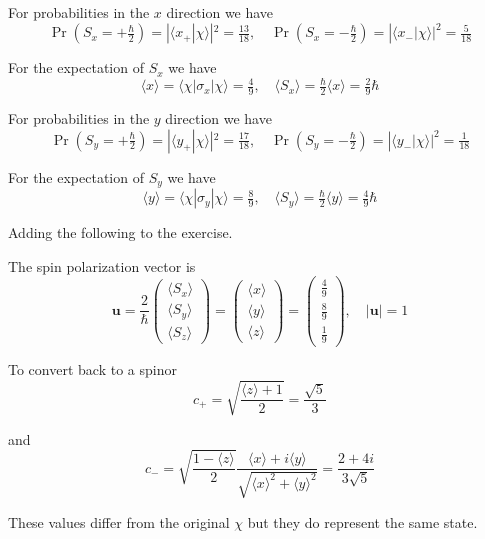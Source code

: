 For probabilities in the $x$ direction we have
\begin{equation*}
\Pr\left(S_x=+\tfrac{\hbar}{2}\right)=|\langle x_+|\chi\rangle|^2=\tfrac{13}{18},\quad
\Pr\left(S_x=-\tfrac{\hbar}{2}\right)=|\langle x_-|\chi\rangle|^2=\tfrac{5}{18}
\end{equation*}

For the expectation of $S_x$ we have
\begin{equation*}
\langle x\rangle=\langle\chi|\sigma_x|\chi\rangle=\tfrac{4}{9},\quad
\langle S_x\rangle=\tfrac{\hbar}{2}\langle x\rangle=\tfrac{2}{9}\hbar
\end{equation*}

For probabilities in the $y$ direction we have
\begin{equation*}
\Pr\left(S_y=+\tfrac{\hbar}{2}\right)=|\langle y_+|\chi\rangle|^2=\tfrac{17}{18},\quad
\Pr\left(S_y=-\tfrac{\hbar}{2}\right)=|\langle y_-|\chi\rangle|^2=\tfrac{1}{18}
\end{equation*}

For the expectation of $S_y$ we have
\begin{equation*}
\langle y\rangle=\langle\chi|\sigma_y|\chi\rangle=\tfrac{8}{9},\quad
\langle S_y\rangle=\tfrac{\hbar}{2}\langle y\rangle=\tfrac{4}{9}\hbar
\end{equation*}

Adding the following to the exercise.

\bigskip
The spin polarization vector is
\begin{equation*}
\mathbf u=\frac{2}{\hbar}
\begin{pmatrix}
\langle S_x\rangle
\\[1ex]
\langle S_y\rangle
\\[1ex]
\langle S_z\rangle
\end{pmatrix}
=
\begin{pmatrix}
\langle x\rangle
\\[1ex]
\langle y\rangle
\\[1ex]
\langle z\rangle
\end{pmatrix}
=
\begin{pmatrix}
\frac{4}{9}
\\[1ex]
\frac{8}{9}
\\[1ex]
\frac{1}{9}
\end{pmatrix},\quad|\mathbf u|=1
\end{equation*}

To convert back to a spinor
\begin{equation*}
c_+=\sqrt{\frac{\langle z\rangle+1}{2}}=\frac{\sqrt5}{3}
\end{equation*}

and
\begin{equation*}
c_-=\sqrt{\frac{1-\langle z\rangle}{2}}
\frac{\langle x\rangle+i\langle y\rangle}{\sqrt{\langle x\rangle^2+\langle y\rangle^2}}
=\frac{2+4i}{3\sqrt5}
\end{equation*}

These values differ from the original $\chi$ but they do represent the same state.


